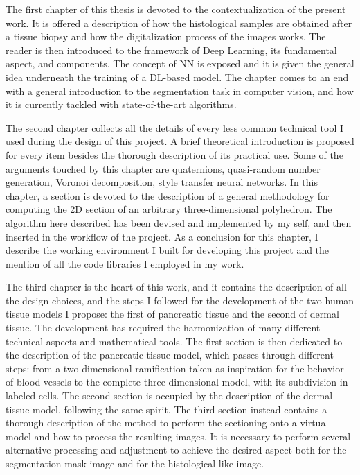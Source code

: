 The first chapter of this thesis is devoted to the contextualization of the present work. It is offered a description of how the histological samples are obtained after a tissue biopsy and how the digitalization process of the images works. The reader is then introduced to the framework of Deep Learning, its fundamental aspect, and components. The concept of NN is exposed and it is given the general idea underneath the training of a DL-based model. The chapter comes to an end with a general introduction to the segmentation task in computer vision, and how it is currently tackled with state-of-the-art algorithms.

The second chapter collects all the details of every less common technical tool I used during the design of this project. A brief theoretical introduction is proposed for every item besides the thorough description of its practical use. Some of the arguments touched by this chapter are quaternions, quasi-random number generation, Voronoi decomposition, style transfer neural networks. In this chapter, a section is devoted to the description of a general methodology for computing the 2D section of an arbitrary three-dimensional polyhedron. The algorithm here described has been devised and implemented by my self, and then inserted in the workflow of the project. As a conclusion for this chapter, I describe the working environment I built for developing this project and the mention of all the code libraries I employed in my work.

The third chapter is the heart of this work, and it contains the description of all the design choices, and the steps I followed for the development of the two human tissue models I propose: the first of pancreatic tissue and the second of dermal tissue. The development has required the harmonization of many different technical aspects and mathematical tools. The first section is then dedicated to the description of the pancreatic tissue model, which passes through different steps: from a two-dimensional ramification taken as inspiration for the behavior of blood vessels to the complete three-dimensional model, with its subdivision in labeled cells. The second section is occupied by the description of the dermal tissue model, following the same spirit. The third section instead contains a thorough description of the method to perform the sectioning onto a virtual model and how to process the resulting images. It is necessary to perform several alternative processing and adjustment to achieve the desired aspect both for the segmentation mask image and for the histological-like image.

